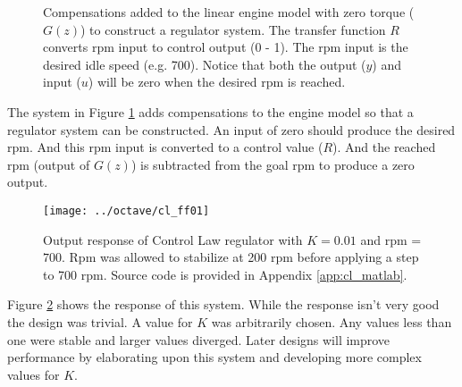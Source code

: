 \documentclass{article}
\begin{document}
\begin{figure}[!htp]
\begin{center}


\end{center}

\caption{Compensations added to the linear engine model with zero
torque ($G(z)$) to construct a regulator system.
The transfer function $R$ converts rpm input to control output (0 - 1).
The rpm input is the desired idle speed (e.g. 700).
Notice that both the output ($y$) and input ($u$) will be zero when
the desired rpm is reached.}
\label{fig:clid02}
\end{figure}

The system in Figure \ref{fig:clid02} adds compensations to the
engine model so that a regulator system can be constructed.
An input of zero should produce the desired rpm.
And this rpm input is converted to a control value ($R$).
And the reached rpm (output of $G(z)$) is subtracted from
the goal rpm to produce a zero output.

\begin{figure}[!htp]
\begin{center}
\texttt{[image: ../octave/cl\_ff01]}
\end{center}
\caption{Output response of Control Law regulator with $K = 0.01$
and rpm = $700$.
Rpm was allowed to stabilize at 200 rpm before applying a step
to 700 rpm.
Source code is provided in Appendix \ref{app:cl_matlab}.}
\label{fig:cl_plot1}
\end{figure}

Figure \ref{fig:cl_plot1} shows the response of this system.
While the response isn't very good the design was trivial.
A value for $K$ was arbitrarily chosen.
Any values less than one were stable and larger values diverged.
Later designs will improve performance by elaborating upon this
system and developing more complex values for $K$.
\end{document}
